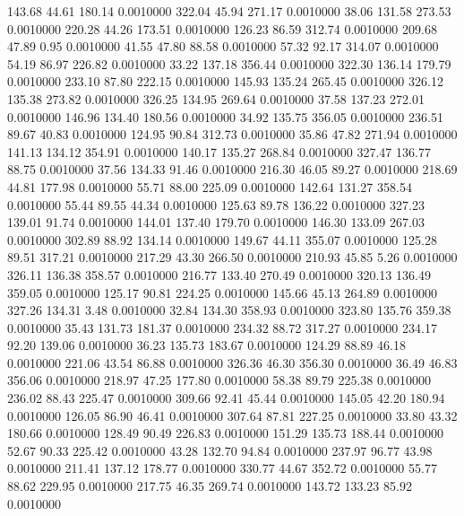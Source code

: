  143.68   44.61  180.14   0.0010000
 322.04   45.94  271.17   0.0010000
  38.06  131.58  273.53   0.0010000
 220.28   44.26  173.51   0.0010000
 126.23   86.59  312.74   0.0010000
 209.68   47.89    0.95   0.0010000
  41.55   47.80   88.58   0.0010000
  57.32   92.17  314.07   0.0010000
  54.19   86.97  226.82   0.0010000
  33.22  137.18  356.44   0.0010000
 322.30  136.14  179.79   0.0010000
 233.10   87.80  222.15   0.0010000
 145.93  135.24  265.45   0.0010000
 326.12  135.38  273.82   0.0010000
 326.25  134.95  269.64   0.0010000
  37.58  137.23  272.01   0.0010000
 146.96  134.40  180.56   0.0010000
  34.92  135.75  356.05   0.0010000
 236.51   89.67   40.83   0.0010000
 124.95   90.84  312.73   0.0010000
  35.86   47.82  271.94   0.0010000
 141.13  134.12  354.91   0.0010000
 140.17  135.27  268.84   0.0010000
 327.47  136.77   88.75   0.0010000
  37.56  134.33   91.46   0.0010000
 216.30   46.05   89.27   0.0010000
 218.69   44.81  177.98   0.0010000
  55.71   88.00  225.09   0.0010000
 142.64  131.27  358.54   0.0010000
  55.44   89.55   44.34   0.0010000
 125.63   89.78  136.22   0.0010000
 327.23  139.01   91.74   0.0010000
 144.01  137.40  179.70   0.0010000
 146.30  133.09  267.03   0.0010000
 302.89   88.92  134.14   0.0010000
 149.67   44.11  355.07   0.0010000
 125.28   89.51  317.21   0.0010000
 217.29   43.30  266.50   0.0010000
 210.93   45.85    5.26   0.0010000
 326.11  136.38  358.57   0.0010000
 216.77  133.40  270.49   0.0010000
 320.13  136.49  359.05   0.0010000
 125.17   90.81  224.25   0.0010000
 145.66   45.13  264.89   0.0010000
 327.26  134.31    3.48   0.0010000
  32.84  134.30  358.93   0.0010000
 323.80  135.76  359.38   0.0010000
  35.43  131.73  181.37   0.0010000
 234.32   88.72  317.27   0.0010000
 234.17   92.20  139.06   0.0010000
  36.23  135.73  183.67   0.0010000
 124.29   88.89   46.18   0.0010000
 221.06   43.54   86.88   0.0010000
 326.36   46.30  356.30   0.0010000
  36.49   46.83  356.06   0.0010000
 218.97   47.25  177.80   0.0010000
  58.38   89.79  225.38   0.0010000
 236.02   88.43  225.47   0.0010000
 309.66   92.41   45.44   0.0010000
 145.05   42.20  180.94   0.0010000
 126.05   86.90   46.41   0.0010000
 307.64   87.81  227.25   0.0010000
  33.80   43.32  180.66   0.0010000
 128.49   90.49  226.83   0.0010000
 151.29  135.73  188.44   0.0010000
  52.67   90.33  225.42   0.0010000
  43.28  132.70   94.84   0.0010000
 237.97   96.77   43.98   0.0010000
 211.41  137.12  178.77   0.0010000
 330.77   44.67  352.72   0.0010000
  55.77   88.62  229.95   0.0010000
 217.75   46.35  269.74   0.0010000
 143.72  133.23   85.92   0.0010000
